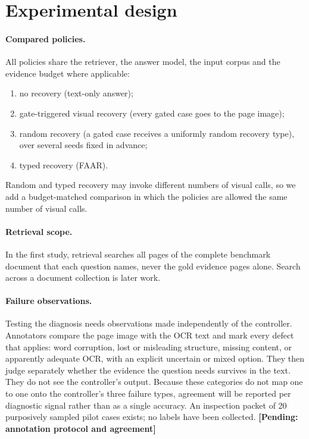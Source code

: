 \documentclass[10pt]{article}
\newcommand{\pending}[1]{\textbf{[Pending: #1]}}
\begin{document}
\section{Experimental design}

\paragraph{Compared policies.} All policies share the retriever, the answer model, the input corpus and the evidence budget where applicable:
\begin{enumerate}[leftmargin=1.4em]
  \item no recovery (text-only answer);
  \item gate-triggered visual recovery (every gated case goes to the page image);
  \item random recovery (a gated case receives a uniformly random recovery type), over several seeds fixed in advance;
  \item typed recovery (FAAR).
\end{enumerate}
Random and typed recovery may invoke different numbers of visual calls, so we add a budget-matched comparison in which the policies are allowed the same number of visual calls.

\paragraph{Retrieval scope.} In the first study, retrieval searches all pages of the complete benchmark document that each question names, never the gold evidence pages alone. Search across a document collection is later work.

\paragraph{Failure observations.} Testing the diagnosis needs observations made independently of the controller. Annotators compare the page image with the OCR text and mark every defect that applies: word corruption, lost or misleading structure, missing content, or apparently adequate OCR, with an explicit uncertain or mixed option. They then judge separately whether the evidence the question needs survives in the text. They do not see the controller's output. Because these categories do not map one to one onto the controller's three failure types, agreement will be reported per diagnostic signal rather than as a single accuracy. An inspection packet of 20 purposively sampled pilot cases exists; no labels have been collected. \pending{annotation protocol and agreement}
\end{document}
